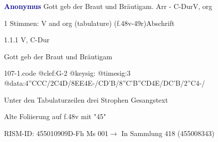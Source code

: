\documentclass[twocolumn, 12pt]{book}
\begin{document}
\par \vspace{16pt} \textcolor{darkblue}{\textbf{Anonymus  }}\hfillplus{\textbf{[107]}}\newline Gott geb der Braut und Bräutigam. Arr - C-Dur\newline V, org
\par \begin{itshape}\end{itshape} 
\par \textcolor{darkblue}{}  1 Stimmen: V and org (tabulature)  (f.48v-49r)\newline Abschrift
\par 1.1.1  V, C-Dur\newline \begin{footnotesize} Gott geb der Braut und Bräutigam \end{footnotesize}  
\begin{filecontents*}{107-1.code}
@clef:G-2
@keysig:
@timesig:3
@data:4''CCC/2C4D/{8EE}4E-/CD'B/{8''C'B''CD}4E/DC'B/2''C4-/
\end{filecontents*}
\newline %
\par Unter den Tabulaturzeilen drei Strophen Gesangstext
\par Alte Foliierung auf f.48v mit "45"
\par RISM-ID: 455010909\newline D-Fh  Ms 001\newline $\rightarrow$ In Sammlung 418 (455008343)
      
\end{document}
